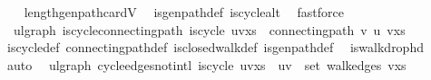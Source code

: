 \begin{isabellebody}
%
\isadelimproof
\ \ %
\endisadelimproof
%
\isatagproof
{}\isamarkupfalse%
\ length{\isacharunderscore}{\kern0pt}gen{\isacharunderscore}{\kern0pt}path{\isacharunderscore}{\kern0pt}card{\isacharunderscore}{\kern0pt}V\ \isamarkupfalse%
\ is{\isacharunderscore}{\kern0pt}gen{\isacharunderscore}{\kern0pt}path{\isacharunderscore}{\kern0pt}def\ is{\isacharunderscore}{\kern0pt}cycle{\isacharunderscore}{\kern0pt}alt\ \isamarkupfalse%
\ fastforce%
\endisatagproof
{\isafoldproof}%
%
\isadelimproof
\isanewline
%
\endisadelimproof
\isanewline
{}\isamarkupfalse%
\ {\isacharparenleft}{\kern0pt}\ ulgraph{\isacharparenright}{\kern0pt}\ is{\isacharunderscore}{\kern0pt}cycle{\isacharunderscore}{\kern0pt}connecting{\isacharunderscore}{\kern0pt}path{\isacharcolon}{\kern0pt}\ {\isachardoublequoteopen}is{\isacharunderscore}{\kern0pt}cycle\ {\isacharparenleft}{\kern0pt}u{\isacharhash}{\kern0pt}v{\isacharhash}{\kern0pt}xs{\isacharparenright}{\kern0pt}\ {\isasymLongrightarrow}\ connecting{\isacharunderscore}{\kern0pt}path\ v\ u\ {\isacharparenleft}{\kern0pt}v{\isacharhash}{\kern0pt}xs{\isacharparenright}{\kern0pt}{\isachardoublequoteclose}\isanewline
%
\isadelimproof
\ \ %
\endisadelimproof
%
\isatagproof
{}\isamarkupfalse%
\ is{\isacharunderscore}{\kern0pt}cycle{\isacharunderscore}{\kern0pt}def\ connecting{\isacharunderscore}{\kern0pt}path{\isacharunderscore}{\kern0pt}def\ is{\isacharunderscore}{\kern0pt}closed{\isacharunderscore}{\kern0pt}walk{\isacharunderscore}{\kern0pt}def\ is{\isacharunderscore}{\kern0pt}gen{\isacharunderscore}{\kern0pt}path{\isacharunderscore}{\kern0pt}def\ \isamarkupfalse%
\ is{\isacharunderscore}{\kern0pt}walk{\isacharunderscore}{\kern0pt}drop{\isacharunderscore}{\kern0pt}hd\ \isamarkupfalse%
\ auto%
\endisatagproof
{\isafoldproof}%
%
\isadelimproof
\isanewline
%
\endisadelimproof
\isanewline
{}\isamarkupfalse%
\ {\isacharparenleft}{\kern0pt}\ ulgraph{\isacharparenright}{\kern0pt}\ cycle{\isacharunderscore}{\kern0pt}edges{\isacharunderscore}{\kern0pt}notin{\isacharunderscore}{\kern0pt}tl{\isacharcolon}{\kern0pt}\ {\isachardoublequoteopen}is{\isacharunderscore}{\kern0pt}cycle{}\ {\isacharparenleft}{\kern0pt}u{\isacharhash}{\kern0pt}v{\isacharhash}{\kern0pt}xs{\isacharparenright}{\kern0pt}\ {\isasymLongrightarrow}\ {\isacharbraceleft}{\kern0pt}u{\isacharcomma}{\kern0pt}v{\isacharbraceright}{\kern0pt}\ {\isasymnotin}\ set\ {\isacharparenleft}{\kern0pt}walk{\isacharunderscore}{\kern0pt}edges\ {\isacharparenleft}{\kern0pt}v{\isacharhash}{\kern0pt}xs{\isacharparenright}{\kern0pt}{\isacharparenright}{\kern0pt}{\isachardoublequoteclose}\isanewline

\end{isabellebody}
